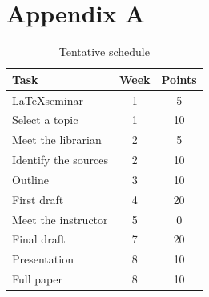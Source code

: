 \documentclass[11pt]{article}
\begin{document}
\printbibliography

\clearpage
\section*{Appendix A}

\begin{table}[!htbp]
    \centering
    \begin{tabular}{|l|c|c|}
        \hline
        Task                 & Week & Points \\
        \hline
        \LaTeX seminar       & 1    & 5      \\
        Select a topic       & 1    & 10     \\
        Meet the librarian   & 2    & 5      \\
        Identify the sources & 2    & 10     \\
        Outline              & 3    & 10     \\
        First draft          & 4    & 20     \\
        Meet the instructor  & 5    & 0      \\
        Final draft          & 7    & 20     \\
        Presentation         & 8    & 10     \\
        Full paper           & 8    & 10     \\
        \hline
    \end{tabular}
    \caption{Tentative schedule}
    \label{tbl:schedule}
\end{table}
\end{document}
